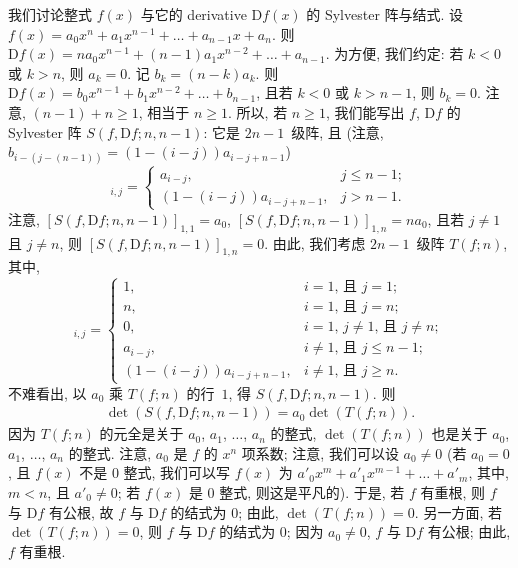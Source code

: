 \documentclass[../libro.tex]{subfiles}
\begin{document}
我们讨论整式 \(f(x)\) 与它的 derivative \(\mathrm{D} f(x)\)
的 Sylvester 阵与结式.
设 \(f(x) = a_0 x^n + a_1 x^{n-1} + \dots + a_{n-1} x + a_n\).
则 \(\mathrm{D} f(x)
= n a_0 x^{n-1} + (n-1) a_1 x^{n-2} + \dots + a_{n-1}\).
为方便, 我们约定:
若 \(k < 0\) 或 \(k > n\), 则 \(a_k = 0\).
记 \(b_k = (n - k) a_k\).
则 \(\mathrm{D} f(x)
= b_0 x^{n-1} + b_1 x^{n-2} + \dots + b_{n-1}\),
且若 \(k < 0\) 或 \(k > n-1\), 则 \(b_k = 0\).
注意, \((n - 1) + n \geq 1\), 相当于 \(n \geq 1\).
所以, 若 \(n \geq 1\), 我们能写出 \(f\), \(\mathrm{D} f\)
的 Sylvester 阵 \(S(f, \mathrm{D} f; n, n-1)\):
它是 \(2n-1\)~级阵, 且
(注意, \(b_{i-(j-(n-1))} = (1 - (i-j)) a_{i-j+n-1}\))
\begin{equation}
    [S(f, \mathrm{D} f; n, n-1)]_{i,j} =
    \begin{cases}
        a_{i-j},
        & j \leq n-1; \\
        (1 - (i - j)) a_{i-j+n-1},
        & j > n-1.
    \end{cases}
    \label{eq:soe10}
\end{equation}
注意, \([S(f, \mathrm{D} f; n, n-1)]_{1,1} = a_0\),
\([S(f, \mathrm{D} f; n, n-1)]_{1,n} = n a_0\),
且若 \(j \neq 1\) 且 \(j \neq n\),
则 \([S(f, \mathrm{D} f; n, n-1)]_{1,n} = 0\).
由此, 我们考虑 \(2n-1\)~级阵 \(T(f; n)\), 其中,
\begin{equation}
    [T(f; n)]_{i,j} =
    \begin{cases}
        1,
        & \text{\(i = 1\), 且 \(j = 1\)}; \\
        n,
        & \text{\(i = 1\), 且 \(j = n\)}; \\
        0,
        & \text{\(i = 1\), \(j \neq 1\), 且 \(j \neq n\)}; \\
        a_{i-j},
        & \text{\(i \neq 1\), 且 \(j \leq n-1\)}; \\
        (1 - (i - j)) a_{i-j+n-1},
        & \text{\(i \neq 1\), 且 \(j \geq n\)}.
    \end{cases}
    \label{eq:soe11}
\end{equation}
不难看出, 以 \(a_0\) 乘 \(T(f; n)\) 的行~\(1\),
得 \(S(f, \mathrm{D} f; n, n-1)\).
则
\begin{align*}
    \det {(S(f, \mathrm{D} f; n, n-1))}
    = a_0 \det {(T(f; n))}.
\end{align*}
因为 \(T(f; n)\) 的元全是关于
\(a_0\), \(a_1\), \(\dots\), \(a_n\) 的整式,
\(\det {(T(f; n))}\) 也是关于
\(a_0\), \(a_1\), \(\dots\), \(a_n\) 的整式.
注意, \(a_0\) 是 \(f\) 的 \(x^n\) 项系数;
注意, 我们可以设 \(a_0 \neq 0\)
(若 \(a_0 = 0\), %
且 \(f(x)\) 不是 \(0\) 整式,
我们可以写 \(f(x)\)
为 \(a'_0 x^m + a'_1 x^{m-1} + \dots + a'_m\),
其中, \(m < n\), 且 \(a'_0 \neq 0\);
若 \(f(x)\) 是 \(0\) 整式, 则这是平凡的). %
于是, 若 \(f\) 有重根,
则 \(f\) 与 \(\mathrm{D} f\) 有公根,
故 \(f\) 与 \(\mathrm{D} f\) 的结式为 \(0\);
由此, \(\det {(T(f; n))} = 0\).
另一方面, 若 \(\det {(T(f; n))} = 0\),
则 \(f\) 与 \(\mathrm{D} f\) 的结式为 \(0\);
因为 \(a_0 \neq 0\),
\(f\) 与 \(\mathrm{D} f\) 有公根;
由此, \(f\) 有重根.
\end{document}
